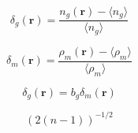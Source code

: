 \documentclass[12pt]{article}
\providecommand{\vecsymbol}[1]{\ensuremath{\boldsymbol{#1}}}
\providecommand{\rv}{\vecsymbol{r}}
\begin{document}
$$
\delta_g(\rv) = \frac{n_g(\rv) - \langle n_g\rangle}{\langle n_g\rangle}
$$

$$
\delta_m(\rv) = \frac{\rho_m(\rv) - \langle \rho_m\rangle}{\langle \rho_m\rangle}
$$

$$
\delta_g(\rv) = b_g \delta_m(\rv)
$$

$$
\left( 2(n-1) \right)^{-1/2}
$$


\end{document}
